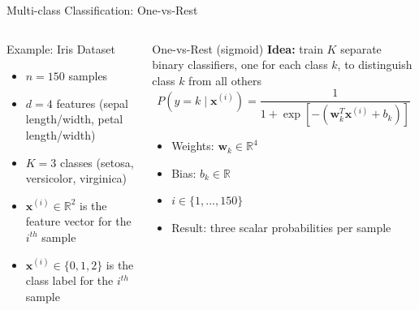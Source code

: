 \documentclass[
                en,
                ]{sdqbeamer}
\begin{document}
\begin{frame}{Multi-class Classification: One-vs-Rest}
    \begin{columns}
        \column{\kitthreecolumns}
        \begin{greenblock}{Example: Iris Dataset}
            \begin{itemize}
                \item $n = 150$ samples
                \item $d = 4$ features (sepal length/width, petal length/width)
                \item $K = 3$ classes (setosa, versicolor, virginica)
                \item $\boldsymbol{x}^{(i)} \in \mathbb{R}^2$ is the feature
                    vector for the $i^{th}$ sample
                \item $\boldsymbol{x}^{(i)} \in \{0, 1, 2\}$ is the class label
                    for the $i^{th}$ sample
            \end{itemize}
        \end{greenblock}

        \column{\kitthreecolumns}

        \begin{greenblock}{One-vs-Rest (sigmoid)}
            \textbf{Idea:} train $K$ separate binary classifiers, one for each
            class $k$, to distinguish class $k$ from all others
            \begin{equation*}
                P(y = k \mid \boldsymbol{x}^{(i)}) = \frac{1}{1 +
                \exp[-(\boldsymbol{w}_k^T \boldsymbol{x}^{(i)} + b_k)]}
            \end{equation*}

            \begin{itemize}
                \item Weights: $\boldsymbol{w}_k \in \mathbb{R}^4$
                \item Bias: $b_k \in \mathbb{R}$
                \item $i \in \{1, ..., 150\}$
                \item Result: three scalar probabilities per sample
            \end{itemize}
        \end{greenblock}
    \end{columns}
\end{frame}
\end{document}
